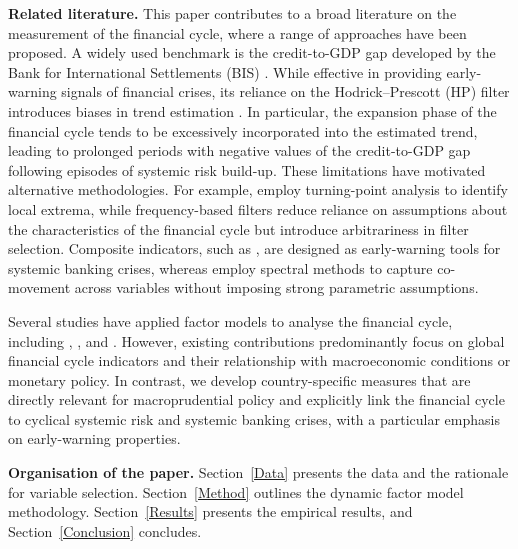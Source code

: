 \textbf{Related literature.} This paper contributes to a broad literature on the measurement of the financial cycle, where a range of approaches have been proposed. A widely used benchmark is the credit-to-GDP gap developed by the Bank for International Settlements (BIS) \citep{drehmann2012characterising}. While effective in providing early-warning signals of financial crises, its reliance on the Hodrick--Prescott (HP) filter introduces biases in trend estimation \citep{schuler2018detrending}. In particular, the expansion phase of the financial cycle tends to be excessively incorporated into the estimated trend, leading to prolonged periods with negative values of the credit-to-GDP gap following episodes of systemic risk build-up. These limitations have motivated alternative methodologies. For example, \citet{drehmann2012characterising} employ turning-point analysis to identify local extrema, while frequency-based filters reduce reliance on assumptions about the characteristics of the financial cycle but introduce arbitrariness in filter selection. Composite indicators, such as \citet{lang2019anticipating}, are designed as early-warning tools for systemic banking crises, whereas \citet{schuler2020financial} employ spectral methods to capture co-movement across variables without imposing strong parametric assumptions.

Several studies have applied factor models to analyse the financial cycle, including \citet{jorg2016analyzing}, \citet{menden2017dissecting}, and \citet{miranda2020us}. However, existing contributions predominantly focus on global financial cycle indicators and their relationship with macroeconomic conditions or monetary policy. In contrast, we develop country-specific measures that are directly relevant for macroprudential policy and explicitly link the financial cycle to cyclical systemic risk and systemic banking crises, with a particular emphasis on early-warning properties.

\textbf{Organisation of the paper.} Section~\ref{Data} presents the data and the rationale for variable selection. Section~\ref{Method} outlines the dynamic factor model methodology. Section~\ref{Results} presents the empirical results, and Section~\ref{Conclusion} concludes.
